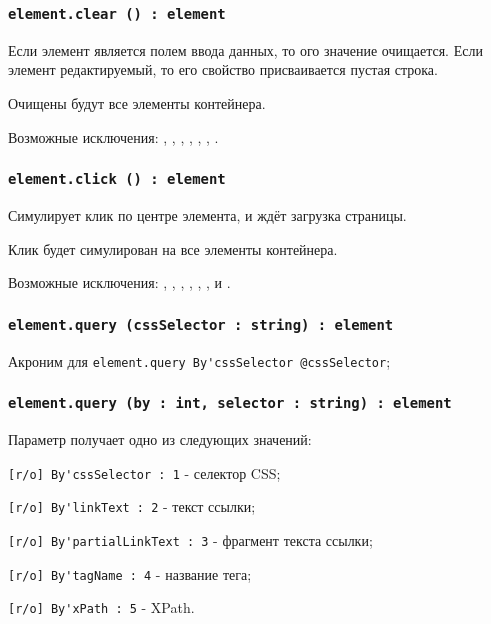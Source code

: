 \subsubsection{\lstinline|element.clear () : element|}

Если элемент является полем ввода данных, то ого значение очищается. Если элемент редактируемый, то его свойство  присваивается пустая строка.

\code{[icL]} Очищены будут все элементы контейнера.

Возможные исключения: , , , , , , .

\subsubsection{\lstinline|element.click () : element|}

Симулирует клик по центре элемента, и ждёт загрузка страницы.

\code{[icL]} Клик будет симулирован на все элементы контейнера.

Возможные исключения: , , , , , ,  и .

\subsubsection{\lstinline|element.query (cssSelector : string) : element|}

Акроним для \lstinline|element.query By'cssSelector @cssSelector|; 

\subsubsection{\lstinline|element.query (by : int, selector : string) : element|}

Параметр  получает одно из следующих значений:
\begin{icItems}
	\item \lstinline|[r/o] By'cssSelector : 1| - селектор CSS;
	\item \lstinline|[r/o] By'linkText : 2| - текст ссылки;
	\item \lstinline|[r/o] By'partialLinkText : 3| - фрагмент текста ссылки;
	\item \lstinline|[r/o] By'tagName : 4| - название тега;
	\item \lstinline|[r/o] By'xPath : 5| - XPath.
\end{icItems}

